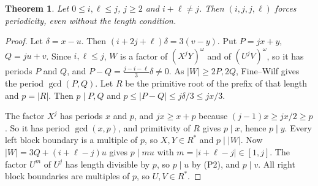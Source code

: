 \documentclass[11pt]{article}
\newtheorem{theorem}{Theorem}
\theoremstyle{remark}\newtheorem*{remark}{Remark}
\begin{document}
\begin{theorem}\label{ijjl}
Let \(0\le i,\ell\le j\), \(j\ge2\) and \(i+\ell\ne j\). Then \((i,j,j,\ell)\) forces periodicity, even without the length condition.
\end{theorem}
\begin{proof}
Let \(\delta=x-u\). Then \((i+2j+\ell)\delta=3(v-y)\). Put \(P=jx+y\), \(Q=ju+v\). Since \(i,\ell\le j\), \(W\) is a factor of \((X^jY)^\omega\) and of \((U^jV)^\omega\), so it has periods \(P\) and \(Q\), and \(P-Q=\tfrac{j-i-\ell}{3}\delta\ne0\). As \(|W|\ge2P,2Q\), Fine--Wilf gives the period \(\gcd(P,Q)\). Let \(R\) be the primitive root of the prefix of that length and \(p=|R|\). Then \(p\mid P,Q\) and \(p\le|P-Q|\le j\delta/3\le jx/3\).

The factor \(X^j\) has periods \(x\) and \(p\), and \(jx\ge x+p\) because \((j-1)x\ge jx/2\ge p\). So it has period \(\gcd(x,p)\), and primitivity of \(R\) gives \(p\mid x\), hence \(p\mid y\). Every left block boundary is a multiple of \(p\), so \(X,Y\in R^*\) and \(p\mid|W|\). Now \(|W|=3Q+(i+\ell-j)u\) gives \(p\mid mu\) with \(m=|i+\ell-j|\in[1,j]\). The factor \(U^m\) of \(U^j\) has length divisible by \(p\), so \(p\mid u\) by (P2), and \(p\mid v\). All right block boundaries are multiples of \(p\), so \(U,V\in R^*\).
\end{proof}
\end{document}
